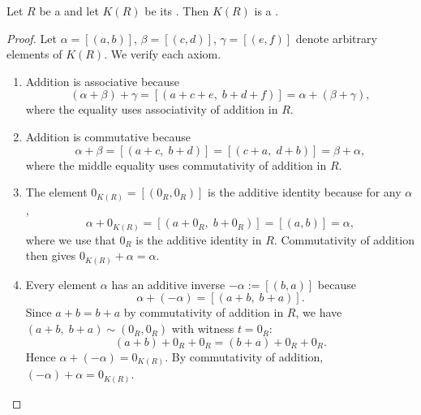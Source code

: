 \begin{proposition} \label{proposition:grothendieck_ring_is_a_ring}
Let $R$ be a  and let $K(R)$ be its . Then $K(R)$ is a .
\end{proposition}

\begin{proof}
Let $\alpha = [(a,b)]$, $\beta = [(c,d)]$, $\gamma = [(e,f)]$ denote arbitrary elements of $K(R)$. We verify each axiom.

\begin{enumerate}
    \item Addition is associative because
    $$(\alpha + \beta) + \gamma = [(a+c+e,\; b+d+f)] = \alpha + (\beta + \gamma),$$
    where the equality uses associativity of addition in $R$.

    \item Addition is commutative because
    $$\alpha + \beta = [(a+c,\; b+d)] = [(c+a,\; d+b)] = \beta + \alpha,$$
    where the middle equality uses commutativity of addition in $R$.

    \item The element $0_{K(R)} = [(0_R, 0_R)]$ is the additive identity because for any $\alpha$,
    $$\alpha + 0_{K(R)} = [(a+0_R,\; b+0_R)] = [(a,b)] = \alpha,$$
    where we use that $0_R$ is the additive identity in $R$. Commutativity of addition then gives $0_{K(R)} + \alpha = \alpha$.

    \item Every element $\alpha$ has an additive inverse $-\alpha := [(b,a)]$ because
    $$\alpha + (-\alpha) = [(a+b,\; b+a)].$$
    Since $a+b = b+a$ by commutativity of addition in $R$, we have $(a+b,\; b+a) \sim (0_R, 0_R)$ with witness $t = 0_R$:
    $$(a+b) + 0_R + 0_R = (b+a) + 0_R + 0_R.$$
    Hence $\alpha + (-\alpha) = 0_{K(R)}$. By commutativity of addition, $(-\alpha) + \alpha = 0_{K(R)}$.


\end{enumerate}
\end{proof}

